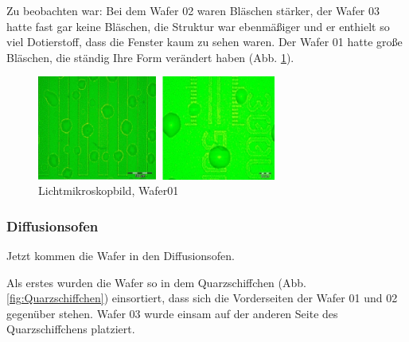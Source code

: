 Zu beobachten war:
Bei dem Wafer 02 waren Bläschen stärker, der Wafer 03 hatte fast gar keine Bläschen, die Struktur war ebenmäßiger und er enthielt so viel Dotierstoff, dass die Fenster kaum zu sehen waren. Der Wafer 01 hatte große Bläschen, die ständig Ihre Form verändert haben (Abb. \ref{fig:Mikroskopbild2}).

\begin{figure}[H]
    \centering
        \includegraphics[width=0.7\textwidth]{bilder/Mikroskopbild2.png}
    \caption{Lichtmikroskopbild, Wafer01}
    \label{fig:Mikroskopbild2}
\end{figure}

\subsubsection[Diffusionsofen]{Diffusionsofen}

Jetzt kommen die Wafer in den Diffusionsofen.

Als erstes wurden die Wafer  so in dem Quarzschiffchen (Abb. \ref{fig:Quarzschiffchen}) einsortiert, dass sich die Vorderseiten der Wafer 01 und 02 gegenüber stehen. Wafer 03 wurde einsam auf der anderen Seite des Quarzschiffchens platziert.

